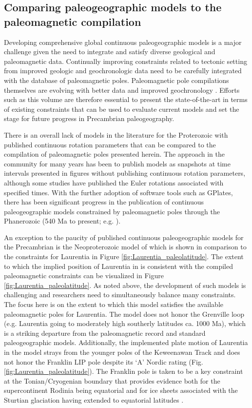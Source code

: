 \documentclass[twocolumn, switch]{article} %
\begin{document}
\subsection{Comparing paleogeographic models to the paleomagnetic compilation}

Developing comprehensive global continuous paleogeographic models is a major challenge given the need to integrate and satisfy diverse geological and paleomagnetic data. Continually improving constraints related to tectonic setting from improved geologic and geochronologic data need to be carefully integrated with the database of paleomagnetic poles. Paleomagnetic pole compilations themselves are evolving with better data and improved geochronology \citep{Evans2021a}. Efforts such as this volume are therefore essential to present the state-of-the-art in terms of existing constraints that can be used to evaluate current models and set the stage for future progress in Precambrian paleogeography.

There is an overall lack of models in the literature for the Proterozoic with published continuous rotation parameters that can be compared to the compilation of paleomagnetic poles presented herein. The approach in the community for many years has been to publish models as snapshots at time intervals presented in figures without publishing continuous rotation parameters, although some studies have published the Euler rotations associated with specified times. With the further adoption of software tools such as GPlates, there has been significant progress in the publication of continuous paleogeographic models constrained by paleomagnetic poles through the Phanerozoic (540 Ma to present; e.g. \citealp{Torsvik2017a}).

An exception to the paucity of published continuous paleogeographic models for the Precambrian is the Neoproterozoic model of \cite{Merdith2017b} which is shown in comparison to the constraints for Laurentia in Figure \ref{fig:Laurentia_paleolatitude}. The extent to which the implied position of Laurentia in \cite{Merdith2017b} is consistent with the compiled paleomagnetic constraints can be visualized in Figure \ref{fig:Laurentia_paleolatitude}. As noted above, the development of such models is challenging and researchers need to simultaneously balance many constraints. The focus here is on the extent to which this model satisfies the available paleomagnetic poles for Laurentia. The model does not honor the Grenville loop (e.g. Laurentia going to moderately high southerly latitudes ca. 1000 Ma), which is a striking departure from the paleomagnetic record and standard paleogeographic models. Additionally, the implemented plate motion of Laurentia in the \cite{Merdith2017b} model strays from the younger poles of the Keweenawan Track and does not honor the Franklin LIP pole \citep{Denyszyn2009b} despite its `A' Nordic rating (Fig. \ref{fig:Laurentia_paleolatitude}). The Franklin pole is taken to be a key constraint at the Tonian/Cryogenian boundary that provides evidence both for the supercontinent Rodinia being equatorial and for ice sheets associated with the Sturtian glaciation having extended to equatorial latitudes \citep{Macdonald2010a}.
\end{document}
